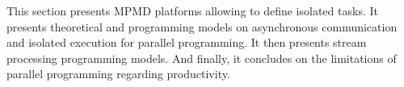 

This section presents MPMD platforms allowing to define isolated tasks.
It presents theoretical and programming models on asynchronous communication and isolated execution for parallel programming.
It then presents stream processing programming models.
And finally, it concludes on the limitations of parallel programming regarding productivity. 








